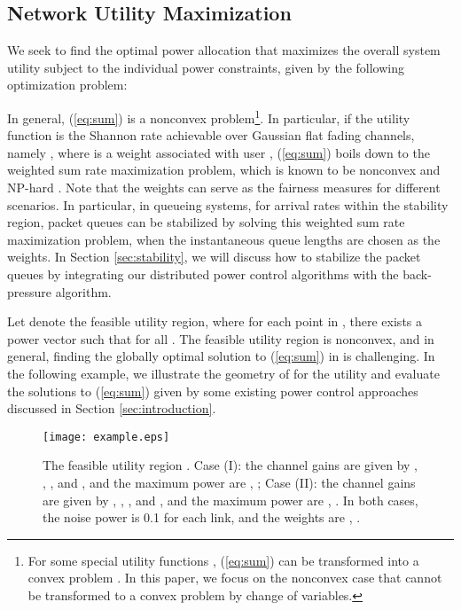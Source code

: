 \documentclass[10pt,journal,letterpaper,compsoc]{IEEEtran}
\begin{document}
\subsection{Network Utility Maximization}
We seek to find the optimal power allocation  that maximizes the overall system utility subject to the individual power constraints, given by the following optimization problem:


In general, (\ref{eq:sum}) is a nonconvex problem\footnote{For some special utility functions , (\ref{eq:sum}) can be transformed into a convex problem \cite{chiang:2007}. In this paper, we focus on the nonconvex case that cannot be transformed to a convex problem by change of variables.}. In particular, if the utility function is the Shannon rate achievable over Gaussian flat fading channels, namely  , where  is a weight associated with user , (\ref{eq:sum}) boils down to the weighted sum rate maximization problem, which is known to be nonconvex and NP-hard \cite{luo:2008}. Note that the weights can serve as the fairness measures\cite{mo:2000} for different scenarios. In particular, in queueing systems, for arrival rates within the stability region, packet queues can be stabilized by solving this weighted sum rate maximization problem, when the instantaneous queue lengths are chosen as the weights. In Section \ref{sec:stability}, we will discuss how to stabilize the packet queues by integrating our distributed power control algorithms with the back-pressure algorithm.

Let  denote the feasible utility region, where for each point  in , there exists a power vector  such that  for all . The feasible utility region  is nonconvex, and in general, finding the globally optimal solution to (\ref{eq:sum}) in  is challenging. In the following example, we illustrate the geometry of  for the utility  and evaluate the solutions to (\ref{eq:sum}) given by some existing power control approaches discussed in Section \ref{sec:introduction}.

\begin{figure}[t]
\centering
\hspace{-0cm}
 {\texttt{[image: example.eps]}}\hspace{-0.0cm}\vspace{0cm}
\caption{The feasible utility region . Case (I): the channel gains are given by , , , and , and the maximum power are , ; Case (II): the channel gains are given by , , , and , and the maximum power are , . In both cases, the noise power is 0.1 for each link, and the weights are , .}\label{fig:example}
\end{figure}
\end{document}
